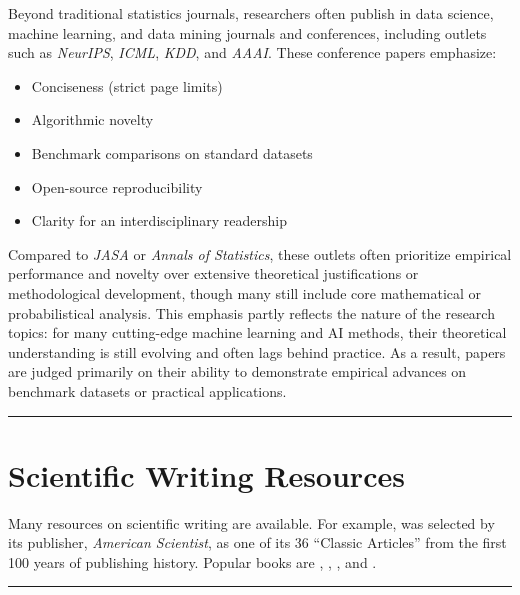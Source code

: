 \documentclass[
]{book}
\providecommand{\tightlist}{%
  \setlength{\itemsep}{0pt}\setlength{\parskip}{0pt}}
\theoremstyle{definition}
\theoremstyle{definition}
\theoremstyle{definition}
\theoremstyle{definition}
\theoremstyle{remark}
\begin{document}
Beyond traditional statistics journals, researchers often publish in data science, machine learning, and data mining journals and conferences, including outlets such as \emph{NeurIPS}, \emph{ICML}, \emph{KDD}, and \emph{AAAI}. These conference papers emphasize:

\begin{itemize}
\tightlist
\item
  Conciseness (strict page limits)\\
\item
  Algorithmic novelty\\
\item
  Benchmark comparisons on standard datasets\\
\item
  Open-source reproducibility\\
\item
  Clarity for an interdisciplinary readership
\end{itemize}

Compared to \emph{JASA} or \emph{Annals of Statistics}, these outlets often prioritize empirical performance and novelty over extensive theoretical justifications or methodological development, though many still include core mathematical or probabilistical analysis. This emphasis partly reflects the nature of the research topics: for many cutting-edge machine learning and AI methods, their theoretical understanding is still evolving and often lags behind practice. As a result, papers are judged primarily on their ability to demonstrate empirical advances on benchmark datasets or practical applications.

\begin{center}\rule{0.5\linewidth}{0.5pt}\end{center}

\section{Scientific Writing Resources}\label{scientific-writing-resources}

Many resources on scientific writing are available. For example, \citet{gopen1990science} was selected by its publisher, \emph{American Scientist}, as one of its 36 ``Classic Articles'' from the first 100 years of publishing history. Popular books are \citet{oshima2000writing}, \citet{gopen2004expectations}, \citet{hairston2003successful}, and \citet{lebrun2021scientific}.

\begin{center}\rule{0.5\linewidth}{0.5pt}\end{center}
\end{document}
